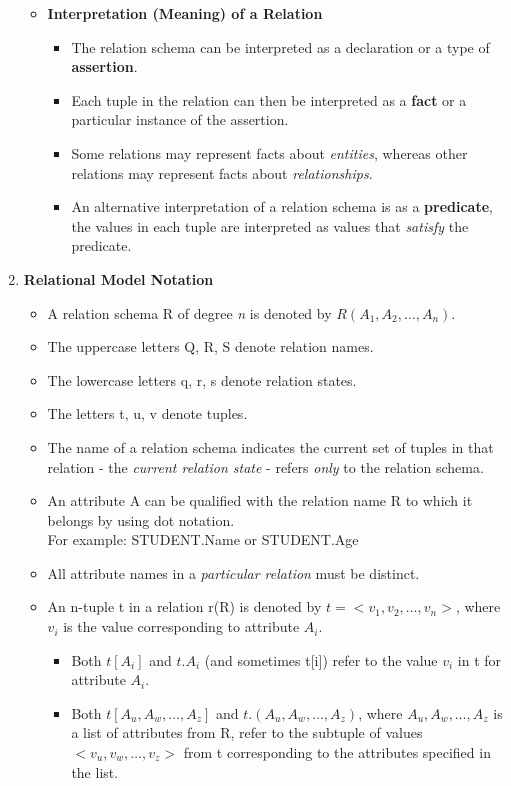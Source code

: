 \documentclass[10pt]{article}
\newcommand{\tf}{\textbf}
\newcommand{\ti}{\textit}
\begin{document}
\begin{enumerate}
\begin{itemize}
		\item \tf{Interpretation (Meaning) of a Relation}
		\begin{itemize}
			\item The relation schema can be interpreted as a declaration or a type of \tf{assertion}.
			\item Each tuple in the relation can then be interpreted as a \tf{fact} or a particular instance of the assertion.
			\item Some relations may represent facts about \ti{entities}, whereas other relations may represent facts about \ti{relationships}.
			\item An alternative interpretation of a relation schema is as a \tf{predicate}, the values in each tuple are interpreted as values that \ti{satisfy} the predicate.
		\end{itemize}
	\end{itemize}

	\item \tf{Relational Model Notation}
	\begin{itemize}
		\item A relation schema R of degree \ti{n} is denoted by $R(A_1, A_2, \ldots, A_n)$.
		\item The uppercase letters Q, R, S denote relation names.
		\item The lowercase letters q, r, s denote relation states.
		\item The letters t, u, v denote tuples.
		\item The name of a relation schema indicates the current set of tuples in that relation - the \ti{current relation state} - refers \ti{only} to the relation schema.
		\item An attribute A can be qualified with the relation name R to which it belongs by using dot notation. \\
		For example: STUDENT.Name or STUDENT.Age
		\item All attribute names in a \ti{particular relation} must be distinct.
		\item An n-tuple t in a relation r(R) is denoted by $t = <v_1, v_2,\ldots , v_n>$, where $v_i$ is the value corresponding to attribute $A_i$. 
		\begin{itemize}
			\item Both $t[A_i]$ and $t.A_i$ (and sometimes t[i]) refer to the value $v_i$ in t for attribute $A_i$.
			\item Both $t[A_u, A_w,\ldots , A_z]$ and $t.(A_u, A_w,\ldots, A_z)$, where $A_u, A_w,\ldots, A_z$ is a list of attributes from R, refer to the subtuple of values $<v_u, v_w,\ldots, v_z>$ from t corresponding to the attributes specified in the list.
		\end{itemize}
	\end{itemize}
\end{enumerate}
\end{document}
